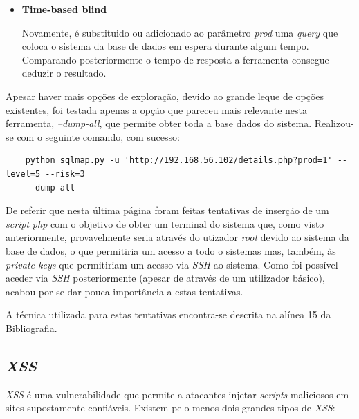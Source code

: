 \documentclass[10pt,english]{article}
\begin{document}
\begin{itemize}
\begin{itemize}
        \item {\textbf{Time-based blind}}
        
        \par Novamente, é substituido ou adicionado ao parâmetro \textit{prod} uma \textit{query} que coloca o sistema da base de dados em espera durante algum tempo. Comparando posteriormente o tempo de resposta a ferramenta consegue deduzir o resultado.
    \end{itemize}
    
    \par Apesar haver mais opções de exploração, devido ao grande leque de opções existentes, foi testada apenas a opção que pareceu mais relevante nesta ferramenta, \textit{--dump-all}, que permite obter toda a base dados do sistema. Realizou-se com o seguinte comando, com sucesso:
    
    \begin{lstlisting}
    python sqlmap.py -u 'http://192.168.56.102/details.php?prod=1' --level=5 --risk=3 
    --dump-all
    \end{lstlisting}
    
    
\end{itemize}

\par De referir que nesta última página foram feitas tentativas de inserção de um \textit{script} \textit{php} com o objetivo de obter um terminal do sistema que, como visto anteriormente, provavelmente seria através do utizador \textit{root} devido ao sistema da base de dados, o que permitiria um acesso a todo o sistemas mas, também, às \textit{private keys} que permitiriam um acesso via \textit{SSH} ao sistema. Como foi possível aceder via \textit{SSH} posteriormente (apesar de através de um utilizador básico), acabou por se dar pouca importância a estas tentativas. 
\par A técnica utilizada para estas tentativas encontra-se descrita na alínea 15 da Bibliografia.

\subsection{\textit{XSS}}

\par \textit{XSS} é uma vulnerabilidade que permite a atacantes injetar \textit{scripts} maliciosos em sites supostamente confiáveis. Existem pelo menos dois grandes tipos de \textit{XSS}:
\end{document}
